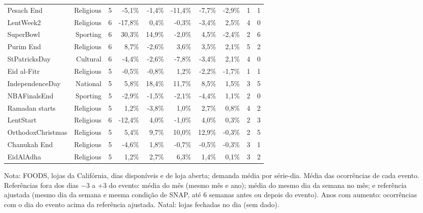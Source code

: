 \begin{table}[htbp]
{\begin{tabular}{lrrrrrrrrr}
Pesach End & Religious & 5 & -5,1\% & -1,4\% & -11,4\% & -7,7\% & -2,9\% & 1 & 1 \\
LentWeek2 & Religious & 6 & -17,8\% & 0,4\% & -0,3\% & -3,4\% & 2,5\% & 4 & 0 \\
SuperBowl & Sporting & 6 & 30,3\% & 14,9\% & -2,0\% & 4,5\% & -2,4\% & 2 & 6 \\
Purim End & Religious & 6 & 8,7\% & -2,6\% & 3,6\% & 3,5\% & 2,1\% & 5 & 2 \\
StPatricksDay & Cultural & 6 & -4,4\% & -2,6\% & -7,8\% & -3,4\% & 2,1\% & 4 & 0 \\
Eid al-Fitr & Religious & 5 & -0,5\% & -0,8\% & 1,2\% & -2,2\% & -1,7\% & 1 & 1 \\
IndependenceDay & National & 5 & 5,8\% & 18,4\% & 11,7\% & 8,5\% & 1,5\% & 3 & 5 \\
NBAFinalsEnd & Sporting & 5 & -2,9\% & -1,5\% & -2,1\% & -4,4\% & 1,1\% & 2 & 0 \\
Ramadan starts & Religious & 5 & 1,2\% & -3,8\% & 1,0\% & 2,7\% & 0,8\% & 4 & 2 \\
LentStart & Religious & 6 & -12,4\% & 4,0\% & -1,0\% & 4,0\% & 0,3\% & 2 & 3 \\
OrthodoxChristmas & Religious & 5 & 5,4\% & 9,7\% & 10,0\% & 12,9\% & -0,3\% & 2 & 5 \\
Chanukah End & Religious & 5 & -4,6\% & 1,8\% & -0,7\% & -0,5\% & -0,3\% & 3 & 1 \\
EidAlAdha & Religious & 5 & 1,2\% & 2,7\% & 6,3\% & 1,4\% & 0,1\% & 3 & 2 \\
\bottomrule
\end{tabular}
}
\par\smallskip
{\footnotesize Nota: FOODS, lojas da Califórnia, dias disponíveis e de loja aberta; demanda média por série-dia. Média das ocorrências de cada evento. Referências fora dos dias $-$3 a +3 do evento: média do mês (mesmo mês e ano); média do mesmo dia da semana no mês; e referência ajustada (mesmo dia da semana e mesma condição de SNAP, até 6 semanas antes ou depois do evento). Anos com aumento: ocorrências com o dia do evento acima da referência ajustada. Natal: lojas fechadas no dia (sem dado).}
\end{table}
